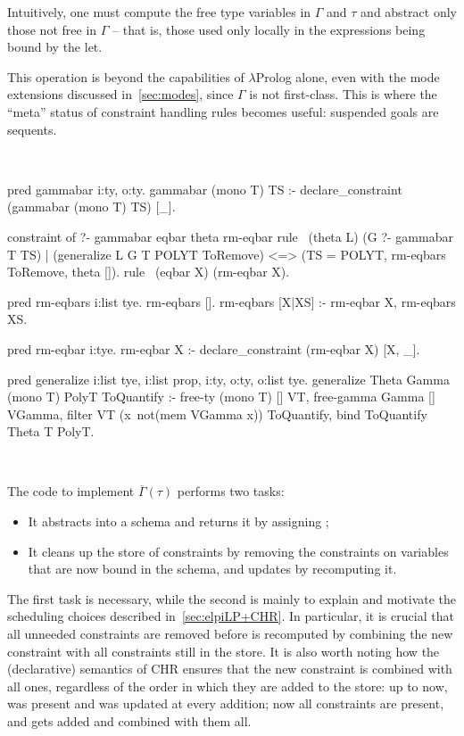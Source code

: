 \documentclass[a4paper, 11pt]{book}
\newenvironment{elpicode}
  {\VerbatimEnvironment~\\\begin{elpibox}\begin{xelpicode}}{\end{xelpicode}
\end{elpibox}\\}
\begin{document}
Intuitively, one must compute the free type variables in $\Gamma$ and $\tau$
and abstract only those not free in $\Gamma$ -- that is, those used only locally
in the expressions being bound by the let.

This operation is beyond the capabilities of $\lambda$Prolog alone, even with
the mode extensions discussed in~\cref{sec:modes}, since $\Gamma$ is not
first-class.
This is where the ``meta'' status of constraint handling rules becomes useful:
suspended goals are sequents.

\begin{elpicode}
pred gammabar i:ty, o:ty.
gammabar (mono T) TS :- declare_constraint (gammabar (mono T) TS) [_].

constraint of ?- gammabar eqbar theta rm-eqbar {
  rule  \ (theta L)
          (G ?- gammabar T TS)              %
        | (generalize L G T POLYT ToRemove) %
      <=> (TS = POLYT, rm-eqbars ToRemove, theta []). %
  rule \ (eqbar X) (rm-eqbar X).
}

pred rm-eqbars i:list tye.
rm-eqbars [].
rm-eqbars [X|XS] :- rm-eqbar X, rm-eqbars XS.

pred rm-eqbar i:tye.
rm-eqbar X :- declare_constraint (rm-eqbar X) [X, _].

pred generalize i:list tye, i:list prop, i:ty, o:ty, o:list tye.
generalize Theta Gamma (mono T) PolyT ToQuantify :-
  free-ty (mono T) [] VT,
  free-gamma Gamma [] VGamma,
  filter VT (x\ not(mem VGamma x)) ToQuantify,
  bind ToQuantify Theta T PolyT.
\end{elpicode}

\noindent
The code to implement $\overline{\Gamma}(\tau)$ performs two tasks:

\begin{itemize}
  \item It abstracts  into a schema  and returns it by
    assigning ;
  \item It cleans up the store of constraints by removing the 
    constraints on variables that are now bound in the schema, and updates
     by recomputing it.
\end{itemize}

The first task is necessary, while the second is mainly to explain and
motivate the scheduling choices described in~\cref{sec:elpiLP+CHR}. In
particular, it is crucial that all unneeded  constraints are
removed before  is recomputed by combining the new constraint
with all  constraints still in the store. It is also worth
noting how the (declarative) semantics of CHR ensures that the new
 constraint is combined with all  ones, regardless
of the order in which they are added to the store: up to now, 
was present and was updated at every  addition; now all
 constraints are present, and  gets added and
combined with them all.
\end{document}
